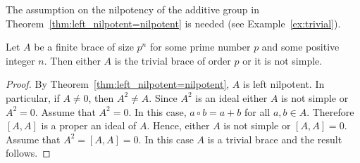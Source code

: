 
The assumption on the nilpotency of the additive group in
Theorem~\ref{thm:left_nilpotent=nilpotent} is needed (see
Example~\ref{ex:trivial}).

\begin{corollary}
    Let $A$ be a finite brace of size $p^n$ for some prime number $p$
    and some positive integer $n$.  Then either $A$ is the trivial brace of
    order $p$ or it is not simple.
\end{corollary}

\begin{proof}
 By Theorem~\ref{thm:left_nilpotent=nilpotent}, $A$ is left nilpotent. In
 particular, if $A\neq 0$, then $A^2\neq A$. Since $A^2$ is an ideal either $A$
 is not simple or $A^2=0$. Assume that $A^2=0$. In this case, $a\circ b=a+b$
 for all $a,b\in A$. Therefore $[A,A]$ is a proper an ideal of $A$. Hence,
 either $A$ is not simple or $[A,A]=0$. Assume that $A^2=[A,A]=0$. In this case
 $A$ is a trivial brace and the result follows.
\end{proof}


